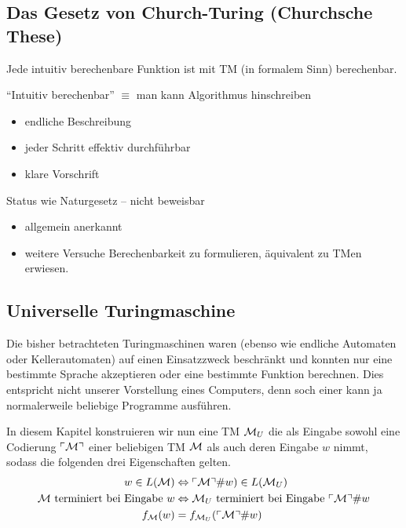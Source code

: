 \subsection{Das Gesetz von Church-Turing (Churchsche These)} %
\begin{Satz}[name={[Intuitiv berechenbare Funktionen sind mit \acs*{TM} berechenbar]}]
	Jede intuitiv berechenbare Funktion ist mit \ac{TM} (in formalem Sinn) berechenbar.
	
	"`Intuitiv berechenbar"' $\equiv$ man kann Algorithmus hinschreiben
	\begin{itemize}
		\item endliche Beschreibung
		\item jeder Schritt effektiv durchführbar
		\item klare Vorschrift
	\end{itemize}
	Status wie Naturgesetz -- nicht beweisbar
	\begin{itemize}[label=\->]
		\item allgemein anerkannt
		\item weitere Versuche Berechenbarkeit zu formulieren, äquivalent zu \ac{TM}en erwiesen.
	\end{itemize}
\end{Satz}



\subsection{Universelle Turingmaschine}
Die bisher betrachteten Turingmaschinen waren (ebenso wie endliche Automaten oder Kellerautomaten) 
auf einen Einsatzzweck beschränkt und konnten nur eine bestimmte Sprache akzeptieren oder eine bestimmte Funktion berechnen.
Dies entspricht nicht unserer Vorstellung eines Computers, denn soch einer kann ja normalerweile beliebige Programme ausführen.

In diesem Kapitel konstruieren wir nun eine \ac{TM} $\mathcal{M}_U$ die als Eingabe sowohl
eine Codierung $\ulcorner \mathcal{M} \urcorner$ einer beliebigen \ac{TM} $\mathcal{M}$ als auch deren Eingabe $w$ nimmt, sodass die folgenden drei Eigenschaften gelten.
\begin{align}
	\label{Mu-eq-lang} w\in L(\mathcal{M}) &\Leftrightarrow \ulcorner \mathcal{M} \urcorner\#w) \in L(\mathcal{M}_U)\\ 
	\label{Mu-eq-term} \text{$\mathcal{M}$ terminiert bei Eingabe $w$} &\Leftrightarrow \text{$\mathcal{M}_U$ terminiert bei Eingabe $\ulcorner \mathcal{M} \urcorner\#w$}\\
	\label{Mu-eq-func} \text{$f_{\mathcal{M}}(w)$} &= \text{$f_{\mathcal{M}_U}(\ulcorner \mathcal{M} \urcorner\#w)$}
\end{align}

